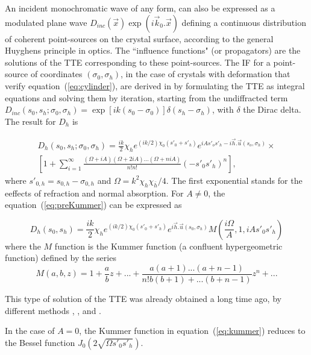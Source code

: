 \documentclass[preprint]{iucr}              %
\newcommand{\inblue}[1]{{\color{black}#1}}
\begin{document}
An incident monochromatic wave of any form, can also be expressed as a modulated plane wave $D_{inc}(\vec x)\exp(i\vec k_0. \vec x)$ defining a continuous distribution of coherent point-sources on the crystal surface, according to the general Huyghens principle in optics. The ``influence functions" (or propagators) are the solutions of the TTE corresponding to these point-sources. The IF for a point-source of coordinates $(\sigma_0,\sigma_h)$, in the case of crystals with deformation that verify equation~(\ref{eq:cylinder}), are derived in \cite{GuigayFerrero2016} by formulating the TTE as integral equations and solving them by iteration, starting from the undiffracted term $D_{inc}(s_0,s_h;\sigma_0,\sigma_h)=\exp[ik(s_0-\sigma_0)]\delta(s_h-\sigma_h)$, \inblue{with $\delta$ the Dirac delta.} The result for $D_h$ is

\begin{multline}
\label{eq:preKummer}
    D_h(s_0,s_h;\sigma_0,\sigma_h) =  \frac{i k}{2} \chi_h e^{(ik/2) \chi_0 (s'_0 + s'_h)} e^{i A s'_o s'_h - i\vec h.\vec u(s_o,\sigma_h)} \times
    \\
    [1 + \sum_{i=1}^\infty \frac{(\Omega + i A )(\Omega+2iA)...(\Omega+niA)}{n!n!}(-s'_0s'_h)^n],
\end{multline}
where $s'_{0,h}=s_{0,h}-\sigma_{0,h}$ and $\Omega = k^2 \chi_h \chi_{\bar h}/4$. The first exponential stands for the eeffects of refraction and normal absorption. For $A\ne0$, the equation~(\ref{eq:preKummer}) can be expressed as
  
\begin{equation}
\label{eq:kummer}
    D_h(s_0,s_h) = \frac{i k }{2} \chi_h e^{(ik/2) \chi_0 (s'_0 + s'_h)} e^{i \vec h . \vec u (s_0,\sigma_h)} M(\frac{i\Omega}{A},1,iA s'_0 s'_h)
\end{equation}
where the $M$ function is the Kummer function (a confluent hypergeometric function) defined by the series
\begin{equation}
\label{eq:kummerSeries}
    M(a,b,z) = 1 + \frac{a}{b} z + 
    ... + \frac{a(a+1)...(a+n-1)}{n! b (b+1)+...(b+n-1)}z^n+...
\end{equation}

This type of solution of the TTE was already obtained a long time ago, by different methods \cite{Petrashen1974}, \cite{Katagawa1974}, \cite{Litzmann1974} and \cite{Chukhovski1977}.


In the case of $A=0$, the Kummer function in equation~(\ref{eq:kummer}) reduces to the Bessel function $J_0(2\sqrt{\Omega s'_0 s'_h})$. 
          
\end{document}
